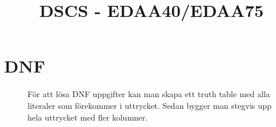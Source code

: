 \documentclass[a4paper]{article}
\title{DSCS - EDAA40/EDAA75}
\begin{document}
\maketitle

\section{DNF}

\begin{figure}[ht]
	\centering
	\caption{För att lösa DNF uppgifter kan man skapa ett truth table med alla literaler som förekommer i uttrycket.
  Sedan bygger man stegvis upp hela uttrycket med fler kolumner.
	}\label{fig:2018-5-1}
\end{figure}
\end{document}
